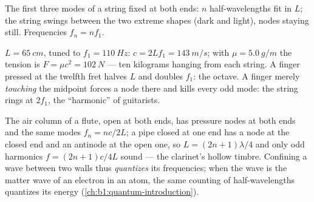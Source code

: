 \begin{omfigure}

{\small The first three modes of a string fixed at both ends: $n$
half-wavelengths fit in $L$; the string swings between the two extreme
shapes (dark and light), nodes staying still. Frequencies $f_n = nf_1$.}
\end{omfigure}

\begin{example}\label{ex:b1:wave-propagation:guitar}
$L = \qty{65}{cm}$, tuned to $f_1 = \qty{110}{Hz}$: $c = 2Lf_1 =
\qty{143}{m/s}$; with $\mu = \qty{5.0}{g/m}$ the tension is $F = \mu c^2
= \qty{102}{N}$ --- ten kilograms hanging from each string. A finger
pressed at the twelfth fret halves $L$ and doubles $f_1$: the octave.
A finger merely \emph{touching} the midpoint forces a node there and
kills every odd mode: the string rings at $2f_1$, the ``harmonic'' of
guitarists.
\end{example}

\begin{remark}\label{rem:b1:wave-propagation:pipes}
The air column of a flute, open at both ends, has pressure nodes at
both ends and the same modes $f_n = nc/2L$; a pipe closed at one end
has a node at the closed end and an antinode at the open one, so
$L = (2n + 1)\lambda/4$ and only odd harmonics $f = (2n + 1)c/4L$
sound --- the clarinet's hollow timbre. Confining a wave between two
walls thus \emph{quantizes} its frequencies; when the wave is the matter
wave of an electron in an atom, the same counting of half-wavelengths
quantizes its energy (\cref{ch:b1:quantum-introduction}).
\end{remark}

